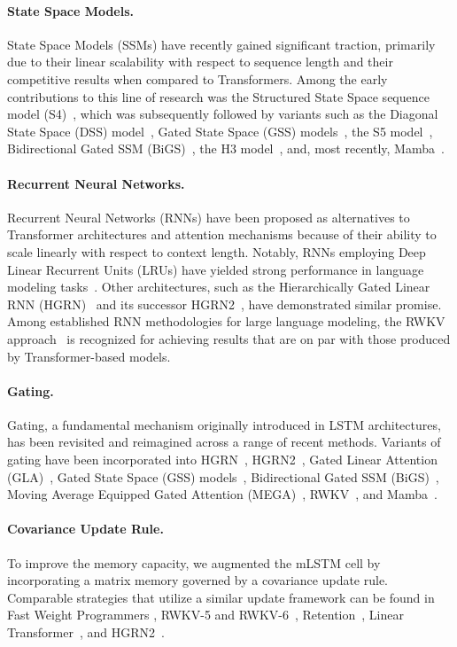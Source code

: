 \paragraph{State Space Models.} State Space Models (SSMs) have recently gained significant traction, primarily due to their linear scalability with respect to sequence length and their competitive results when compared to Transformers. Among the early contributions to this line of research was the Structured State Space sequence model (S4)~\citep{Gu:21}, which was subsequently followed by variants such as the Diagonal State Space (DSS) model~\citep{Gupta:22}, Gated State Space (GSS) models~\citep{Mehta:22}, the S5 model~\citep{Smith:22}, Bidirectional Gated SSM (BiGS)~\citep{Wang:22}, the H3 model~\citep{Fu:23}, and, most recently, Mamba~\citep{Gu:24arxiv}.

\paragraph{Recurrent Neural Networks.} Recurrent Neural Networks (RNNs) have been proposed as alternatives to Transformer architectures and attention mechanisms because of their ability to scale linearly with respect to context length. Notably, RNNs employing Deep Linear Recurrent Units (LRUs) have yielded strong performance in language modeling tasks~\citep{Orvieto:23, De:24arxiv}. Other architectures, such as the Hierarchically Gated Linear RNN (HGRN)~\citep{Qin:23} and its successor HGRN2~\citep{Qin:24arxiv}, have demonstrated similar promise. Among established RNN methodologies for large language modeling, the RWKV approach~\citep{Peng:23arxivshort,Peng:24arxivshort} is recognized for achieving results that are on par with those produced by Transformer-based models.

\paragraph{Gating.}
Gating, a fundamental mechanism originally introduced in LSTM architectures, has been revisited and reimagined across a range of recent methods. Variants of gating have been incorporated into HGRN~\citep{Qin:23}, HGRN2~\citep{Qin:24arxiv}, Gated Linear Attention (GLA)~\citep{Yang:23arxiv}, Gated State Space (GSS) models~\citep{Mehta:22}, Bidirectional Gated SSM (BiGS)~\citep{Wang:22}, Moving Average Equipped Gated Attention (MEGA)~\citep{Ma:22}, RWKV~\citep{Peng:23arxivshort}, and Mamba~\citep{Gu:24arxiv}.

\paragraph{Covariance Update Rule.} To improve the memory capacity, we augmented the mLSTM cell by incorporating a matrix memory governed by a covariance update rule. Comparable strategies that utilize a similar update framework can be found in Fast Weight Programmers \citep{Schmidhuber:92ncfastweights,Schlag:21}, RWKV-5 and RWKV-6~\citep{Peng:24arxivshort}, Retention~\citep{Sun:23arxiv}, Linear Transformer~\citep{Katharopoulos:20}, and HGRN2~\citep{Qin:24arxiv}.

